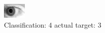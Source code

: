 \begin{figure}[h!]
\begin{center}
\includegraphics[width=0.60\columnwidth]{figures/ID307_class_4_target_3.png}
\end{center}
\caption{ Classification: 4 actual target: 3}
\label{fig:ID307_class_4_target_3}
\end{figure}
